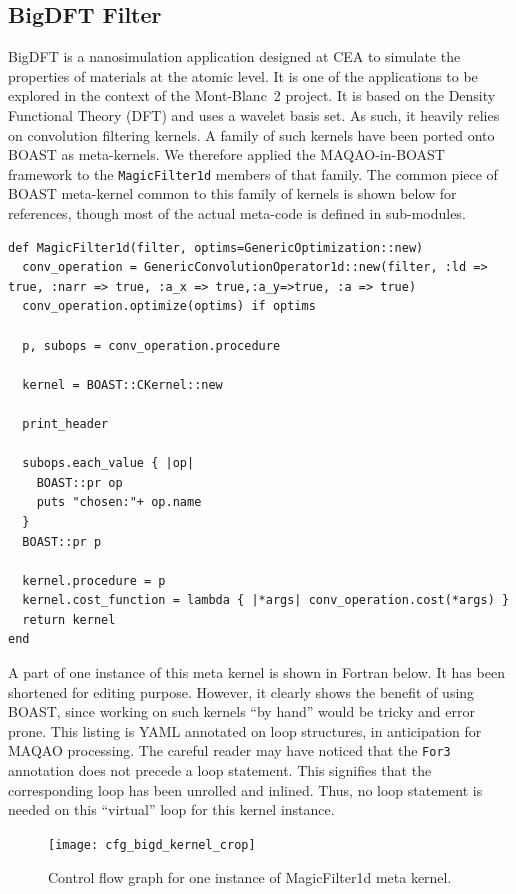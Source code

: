 \documentclass[11pt, a4paper, twoside]{montblanc2}
\begin{document}
  \subsection{BigDFT Filter}

  BigDFT is a nanosimulation application designed at CEA to simulate the 
  properties of materials at the atomic level. It is one of the applications to 
  be explored in the context of the Mont-Blanc~2 project.
  It is based on the Density Functional Theory (DFT) and uses a wavelet basis 
  set. As such, it heavily relies on convolution filtering kernels. A family of 
  such kernels have been ported onto BOAST as meta-kernels. We therefore applied 
  the MAQAO-in-BOAST framework to the \texttt{MagicFilter1d} members of that 
  family. The common piece of BOAST meta-kernel common to this family of kernels 
  is shown below for references, though most of the actual meta-code is defined 
  in sub-modules.

\begin{lstlisting}[style=BOAST]
def MagicFilter1d(filter, optims=GenericOptimization::new)
  conv_operation = GenericConvolutionOperator1d::new(filter, :ld => true, :narr => true, :a_x => true,:a_y=>true, :a => true)
  conv_operation.optimize(optims) if optims

  p, subops = conv_operation.procedure

  kernel = BOAST::CKernel::new

  print_header

  subops.each_value { |op|
    BOAST::pr op
    puts "chosen:"+ op.name
  }
  BOAST::pr p

  kernel.procedure = p
  kernel.cost_function = lambda { |*args| conv_operation.cost(*args) }
  return kernel
end
\end{lstlisting}

A part of one instance of this meta kernel is shown in Fortran below. It has 
been shortened for editing purpose. However, it clearly shows the benefit of 
using BOAST, since working on such kernels ``by hand'' would be tricky and error 
prone. This listing is YAML annotated on loop structures, in anticipation for 
MAQAO processing. The careful reader may have noticed that the \texttt{For3} 
annotation does not precede a loop statement. This signifies that the 
corresponding loop has been unrolled and inlined. Thus, no loop statement is 
needed on this ``virtual'' loop for this kernel instance.


\begin{figure}[p]
  \centering
\texttt{[image: cfg\_bigd\_kernel\_crop]}
\caption{Control flow graph for one instance of MagicFilter1d meta 
kernel.}\label{fig:cfgmf1d}
\end{figure}
\end{document}
